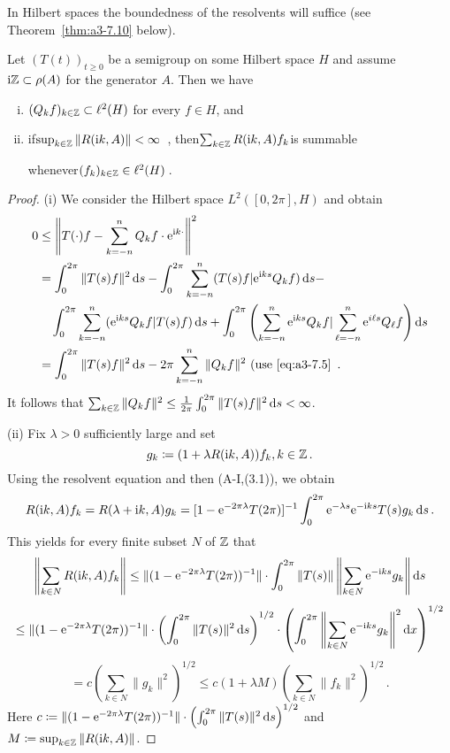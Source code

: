 In Hilbert spaces the boundedness of the resolvents will suffice (see Theorem~\ref{thm:a3-7.10} below).
\begin{lemma}\label{lem:a3-7.9}
Let $(T(t))_{t\geq 0}$ be a semigroup on some Hilbert space $H$ and assume $\mathrm{i}\mathbb{Z} \subset \rho(A)$ for the generator $A$.
Then we have
\begin{enumerate}[(i)]
\item 
$(Q_{k}f)_{k\in\mathbb{Z}} \subset \ell^{2}(H)$ for every $f \in H$, and

\item 
if\quad $\sup_{k\in\mathbb{Z}}\|R(\mathrm{i} k,A)\| < \infty$~, then\quad $\sum_{k\in\mathbb{Z}} R(\mathrm{i} k,A)f_{k}$\quad is summable 

whenever\quad $(f_{k})_{k\in\mathbb{Z}} \in \ell^{2}(H)$\,.
\end{enumerate}
\end{lemma}
\begin{proof}
(i) We consider the Hilbert space $L^{2}([0,2\pi],H)$ and obtain
\begin{align*}
0 &\leq \left\|T(\cdot)f - \sum_{k=-n}^{n} Q_{k}f\cdot \mathrm{e}^{\mathrm{i} k\cdot}\right\|^{2} \\
&= \int_{0}^{2\pi} \|T(s)f\|^{2} \mathop{}\!\mathrm{d}{s} - \int_{0}^{2\pi} \sum_{k=-n}^{n} (T(s)f|\mathrm{e}^{\mathrm{i} ks}Q_{k}f) \mathop{}\!\mathrm{d}{s} - \\
&\quad \int_{0}^{2\pi} \sum_{k=-n}^{n} (\mathrm{e}^{\mathrm{i} ks}Q_{k}f|T(s)f) \mathop{}\!\mathrm{d}{s} + \int_{0}^{2\pi} \left(\sum_{k=-n}^{n} \mathrm{e}^{\mathrm{i} ks}Q_{k}f|\sum_{\ell=-n}^{n} \mathrm{e}^{i\ell s}Q_{\ell}f\right) \mathop{}\!\mathrm{d}{s} \\
&= \int_{0}^{2\pi} \|T(s)f\|^{2} \mathop{}\!\mathrm{d}{s} - 2\pi\sum_{k=-n}^{n} \|Q_{k}f\|^{2} \text{ (use \eqref{eq:a3-7.5} }\,.
\end{align*}
It follows that $\sum_{k\in\mathbb{Z}} \|Q_{k}f\|^{2} \leq \frac{1}{2\pi}\int_{0}^{2\pi} \|T(s)f\|^{2} \mathop{}\!\mathrm{d}{s} < \infty$.

(ii) Fix $\lambda > 0$ sufficiently large and set 
\[
g_{k}\coloneqq (1 + \lambda R(\mathrm{i} k,A))f_{k}, k \in \mathbb{Z}\,.
\]
Using the resolvent equation and then (A-I,(3.1)), we obtain
\[
R(\mathrm{i} k,A)f_{k} = R(\lambda + \mathrm{i} k,A)g_{k} = [1 - \mathrm{e}^{-2\pi\lambda}T(2\pi)]^{-1}\int_{0}^{2\pi} \mathrm{e}^{-\lambda s}\mathrm{e}^{-\mathrm{i} ks}T(s)g_{k} \mathop{}\!\mathrm{d}{s}\,.
\]
This yields for every finite subset $N$ of $\mathbb{Z}$ that
\[
\left\|\sum_{k\in N} R(\mathrm{i} k,A)f_{k}\right\| \leq \|(1 - \mathrm{e}^{-2\pi\lambda}T(2\pi))^{-1}\|\cdot\int_{0}^{2\pi} \|T(s)\| \left\|\sum_{k\in N} \mathrm{e}^{-\mathrm{i} ks}g_{k}\right\| \mathop{}\!\mathrm{d}{s}
\]
\[
\leq \|(1 - \mathrm{e}^{-2\pi\lambda}T(2\pi))^{-1}\|\cdot\left(\int_{0}^{2\pi}\|T(s)\|^{2} \mathop{}\!\mathrm{d}{s}\right)^{1/2} \cdot \left(\int_{0}^{2\pi}\left\|\sum_{k\in N} \mathrm{e}^{-\mathrm{i} ks}g_{k}\right\|^{2} \mathop{}\!\mathrm{d}{x}\right)^{1/2}
\]
\[
= c(\sum_{k\in N} \|g_{k}\|^{2})^{1/2} \leq c(1 + \lambda M)\left(\sum_{k\in N} \|f_{k}\|^{2}\right)^{1/2}\,.
\]
Here $c\coloneqq \|(1 - \mathrm{e}^{-2\pi\lambda}T(2\pi))^{-1}\|\cdot\left(\int_{0}^{2\pi}\|T(s)\|^{2} \mathop{}\!\mathrm{d}{s}\right)^{1/2}$ and $M\coloneqq \sup_{k\in\mathbb{Z}}\|R(\mathrm{i} k,A)\|$.
\end{proof}
